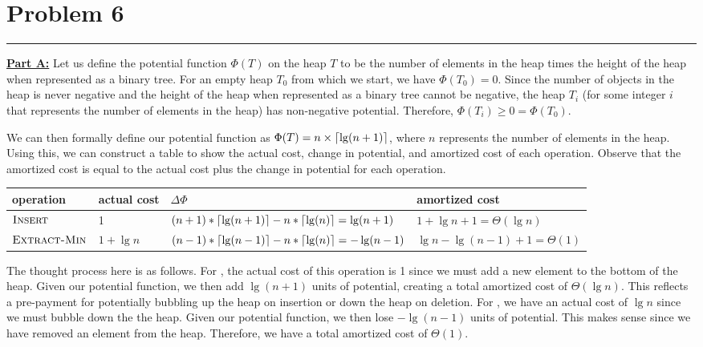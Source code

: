 \documentclass[11pt]{article}
\def\separateline{\medskip\hrule\medskip}
\DeclarePairedDelimiter{\ceil}{\lceil}{\rceil}
\begin{document}
\newpage

\section{Problem 6}
\separateline

\textbf{\underline{Part A:}} Let us define the potential function $\Phi(T)$ on the heap $T$ to be the number of elements in the heap times the height of the heap when represented as a binary tree. For an empty heap $T_0$ from which we start, we have $\Phi(T_0) = 0$. Since the number of objects in the heap is never negative and the height of the heap when represented as a binary tree cannot be negative, the heap $T_i$ (for some integer $i$ that represents the number of elements in the heap) has non-negative potential. Therefore, $\Phi(T_i) \geq 0 = \Phi(T_0)$.

We can then formally define our potential function as $\Phi(T) = n \times \ceil{\lg(n+1)}$, where $n$ represents the number of elements in the heap. Using this, we can construct a table to show the actual cost, change in potential, and amortized cost of each operation. Observe that the amortized cost is equal to the actual cost plus the change in potential for each operation.

\begin{table}[H]
\begin{tabular}{l|l|l|l}
operation                   & actual cost & $\Delta \Phi$     & amortized cost \\ \hline
$\textnormal{\scshape Insert}$             & 1     & $(n+1)*\ceil{\lg(n+1)} - n*\ceil{\lg(n)} = \lg(n+1)$     & $1 + \lg{n+1} = \Theta(\lg{n})$\\
$\textnormal{\scshape Extract-Min}$        & $1 + \lg{n}$  & $(n-1)*\ceil{\lg(n-1)} - n*\ceil{\lg(n)} = -\lg(n-1)$      & $\lg{n} - \lg(n-1) + 1 = \Theta(1)$
\end{tabular}
\end{table}

The thought process here is as follows. For , the actual cost of this operation is 1 since we must add a new element to the bottom of the heap. Given our potential function, we then add $\lg(n+1)$ units of potential, creating a total amortized cost of $\Theta(\lg{n})$. This reflects a pre-payment for potentially bubbling up the heap on insertion or down the heap on deletion. For , we have an actual cost of $\lg{n}$ since we must bubble down the the heap. Given our potential function, we then lose $-\lg(n-1)$ units of potential. This makes sense since we have removed an element from the heap. Therefore, we have a total amortized cost of $\Theta(1)$.
\end{document}
